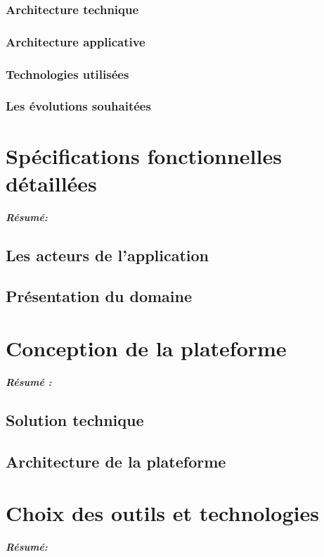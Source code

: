 \documentclass[a4paper, 12pt]{report}
\begin{document}
\subsection{Architecture technique}
\subsection{Architecture applicative}
\subsection{Technologies utilisées}
\subsection{Les évolutions souhaitées}


\chapter{Spécifications fonctionnelles détaillées}
\textit{\textbf{Résumé:}}
\setcounter{minitocdepth}{2}
\minitoc
\section{Les acteurs de l'application}
\section{Présentation du domaine}


\chapter{Conception de la plateforme}
\textit{\textbf{Résumé : }}
\setcounter{minitocdepth}{1}
\minitoc
\newpage
\section{Solution technique}

\section{Architecture de la plateforme}

\chapter{Choix des outils et technologies}
\textit{\textbf{Résumé:} }
\minitoc
\newpage
\end{document}
